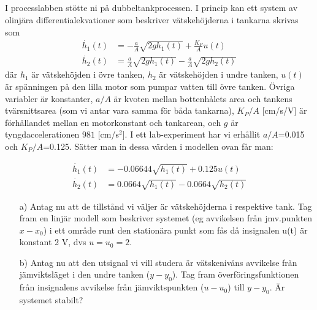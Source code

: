 \subsection{}
I processlabben stötte ni på dubbeltankprocessen. I princip
kan ett system av 
olinjära differentialekvationer som beskriver vätskehöjderna i tankarna
skrivas som
\begin{align*}
\dot{h_1}(t)&=-\frac{a}{A}\sqrt{2 g h_1(t)}+\frac{K_P}{A}u(t)\\
\dot{h_2}(t)&=\frac{a}{A}\sqrt{2 g h_1(t)}-\frac{a}{A}\sqrt{2 g h_2(t)}
\end{align*}
där $h_1$ är vätskehöjden i övre tanken, $h_2$ är vätskehöjden i undre
tanken, $u(t)$ är spänningen på den lilla motor som pumpar vatten till
övre tanken. Övriga variabler är konstanter, $a/A$ är kvoten mellan
bottenhålets area och tankens tvärsnittsarea (som vi antar vara samma
för båda tankarna), $K_P/A$ [cm/s/V] är förhållandet mellan en motorkonstant
och tankarean, och $g$ är tyngdaccelerationen $981$ [cm/s$^2$]. I ett
lab-experiment har vi erhållit $a/A$=0.015 och $K_P/A$=0.125. Sätter
man in dessa värden i modellen ovan får man:

\begin{align*}
\dot{h_1}(t)&=-0.06644\sqrt{h_1(t)}+0.125u(t)\\
\dot{h_2}(t)&=0.0664\sqrt{h_1(t)}-0.0664\sqrt{h_2(t)}
\end{align*} 

\begin{itemize}
\item[a)] Antag nu att de tillstånd vi väljer är vätskehöjderna i
  respektive tank. Tag fram en linjär modell som beskriver systemet
  (eg avvikelsen från jmv.punkten $x-x_0$) i
  ett område runt den stationära punkt som fås
  då insignalen u(t) är konstant 2 V, dvs $u=u_0=2$.

\item[b)] Antag nu att den utsignal vi vill studera är vätskenivåns
  avvikelse från jämviktsläget i
  den undre tanken ($y-y_0$). Tag fram överföringsfunktionen från
  insignalens avvikelse från jämviktspunkten ($u-u_0$) till
  $y-y_0$. Är systemet stabilt?

\end{itemize}

